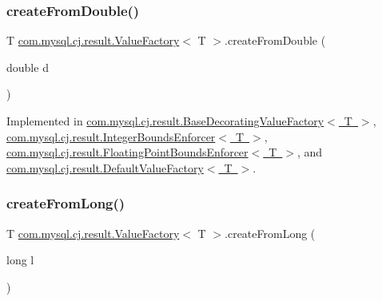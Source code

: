 \subsubsection{\texorpdfstring{create\+From\+Double()}{createFromDouble()}}
{\footnotesize\ttfamily T \mbox{\hyperlink{interfacecom_1_1mysql_1_1cj_1_1result_1_1_value_factory}{com.\+mysql.\+cj.\+result.\+Value\+Factory}}$<$ T $>$.create\+From\+Double (\begin{DoxyParamCaption}\item[{double}]{d }\end{DoxyParamCaption})}



Implemented in \mbox{\hyperlink{classcom_1_1mysql_1_1cj_1_1result_1_1_base_decorating_value_factory_a7339df10ef5bc202ad0568b232afd530}{com.\+mysql.\+cj.\+result.\+Base\+Decorating\+Value\+Factory$<$ T $>$}}, \mbox{\hyperlink{classcom_1_1mysql_1_1cj_1_1result_1_1_integer_bounds_enforcer_af5d807e10e726b20661c10addd2261f2}{com.\+mysql.\+cj.\+result.\+Integer\+Bounds\+Enforcer$<$ T $>$}}, \mbox{\hyperlink{classcom_1_1mysql_1_1cj_1_1result_1_1_floating_point_bounds_enforcer_a23903d828983506aad93a481709e51df}{com.\+mysql.\+cj.\+result.\+Floating\+Point\+Bounds\+Enforcer$<$ T $>$}}, and \mbox{\hyperlink{classcom_1_1mysql_1_1cj_1_1result_1_1_default_value_factory_a5a769375b9daa8f06534dec605997715}{com.\+mysql.\+cj.\+result.\+Default\+Value\+Factory$<$ T $>$}}.

\mbox{\label{interfacecom_1_1mysql_1_1cj_1_1result_1_1_value_factory_a48c32868f2e3efac502522211a40f642}} 
\subsubsection{\texorpdfstring{create\+From\+Long()}{createFromLong()}}
{\footnotesize\ttfamily T \mbox{\hyperlink{interfacecom_1_1mysql_1_1cj_1_1result_1_1_value_factory}{com.\+mysql.\+cj.\+result.\+Value\+Factory}}$<$ T $>$.create\+From\+Long (\begin{DoxyParamCaption}\item[{long}]{l }\end{DoxyParamCaption})}



